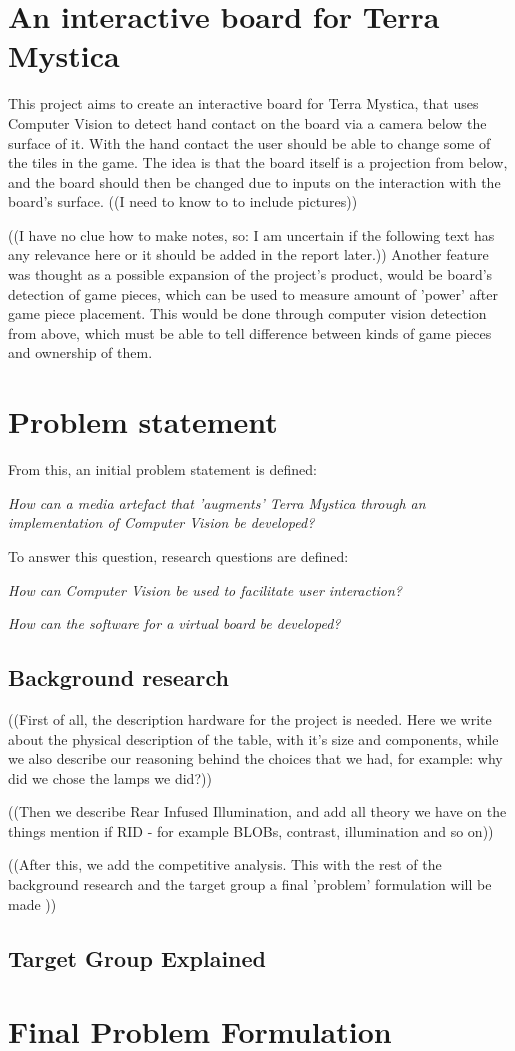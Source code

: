 \section{An interactive board for Terra Mystica}
This project aims to create an interactive board for Terra Mystica, that uses Computer Vision to detect hand contact on the board via a camera below the surface of it. With the hand contact the user should be able to change some of the tiles in the game. The idea is that the board itself is a projection from below, and the board should then be changed due to inputs on the interaction with the board's surface. ((I need to know to to include pictures))

((I have no clue how to make notes, so: I am uncertain if the following text has any relevance here or it should be added in the report later.))
Another feature was thought as a possible expansion of the project's product, would be board's detection of game pieces, which can be used to measure amount of 'power' after game piece placement. This would be done through computer vision detection from above, which must be able to tell difference between kinds of game pieces and ownership of them.

\section{Problem statement}
From this, an initial problem statement is defined: 

\textit{How can a media artefact that 'augments' Terra Mystica through an implementation of Computer Vision be developed?}

To answer this question, research questions are defined:

\textit{How can Computer Vision be used to facilitate user interaction?}

\textit{How can the software for a virtual board be developed?}

\subsection{Background research}
((First of all, the description hardware for the project is needed. Here we write about the physical description of the table, with it's size and components, while we also describe our reasoning behind the choices that we had, for example: why did we chose the lamps we did?))

((Then we describe Rear Infused Illumination, and add all theory we have on the things mention if RID - for example BLOBs, contrast, illumination and so on))

((After this, we add the competitive analysis. This with the rest of the background research and the target group a final 'problem' formulation will be made ))



\subsection{Target Group Explained}

\section{Final Problem Formulation}\label{sec:finalprob}

